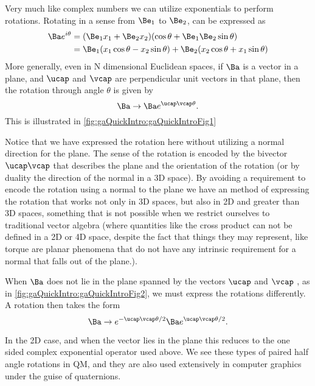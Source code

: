 %
%

Very much like complex numbers we can utilize exponentials to perform rotations.  Rotating in a sense from \(\Be_1\) to \(\Be_2\), can be expressed as
%
\begin{equation}\label{eqn:gaQuickIntro:290}
\begin{aligned}
\Ba e^{i \theta}
&=
(\Be_1 x_1 + \Be_2 x_2) (\cos\theta + \Be_1 \Be_2 \sin\theta) \\
&=
\Be_1 (x_1 \cos\theta - x_2 \sin\theta)
+
\Be_2 (x_2 \cos\theta + x_1 \sin\theta)
\end{aligned}
\end{equation}
%
More generally, even in N dimensional Euclidean spaces, if \(\Ba\) is a vector in a plane, and \(\ucap\) and \(\vcap\) are perpendicular unit vectors in that plane, then the rotation through angle \(\theta\) is given by
%
\begin{equation}\label{eqn:gaQuickIntro:190}
\Ba \rightarrow \Ba e^{\ucap \vcap \theta}.
\end{equation}
%
This is illustrated in \cref{fig:gaQuickIntro:gaQuickIntroFig1}


Notice that we have expressed the rotation here without utilizing a normal direction for the plane.  The sense of the rotation is encoded by the bivector \(\ucap \vcap\) that describes the plane and the orientation of the rotation (or by duality the direction of the normal in a 3D space).  By avoiding a requirement to encode the rotation using a normal to the plane we have an method of expressing the rotation that works not only in 3D spaces, but also in 2D and greater than 3D spaces, something that is not possible when we restrict ourselves to traditional vector algebra (where quantities like the cross product can not be defined in a 2D or 4D space, despite the fact that things they may represent, like torque are planar phenomena that do not have any intrinsic requirement for a normal that falls out of the plane.).

When \(\Ba\) does not lie in the plane spanned by the vectors \(\ucap\) and \(\vcap\) , as in \cref{fig:gaQuickIntro:gaQuickIntroFig2}, we must express the rotations differently.  A rotation then takes the form
%
\begin{equation}\label{eqn:gaQuickIntro:210}
\Ba \rightarrow
e^{-\ucap \vcap \theta/2}
\Ba
e^{\ucap \vcap \theta/2}.
\end{equation}
%


In the 2D case, and when the vector lies in the plane this reduces to the one sided complex exponential operator used above.  We see these types of paired half angle rotations in QM, and they are also used extensively in computer graphics under the guise of quaternions.
